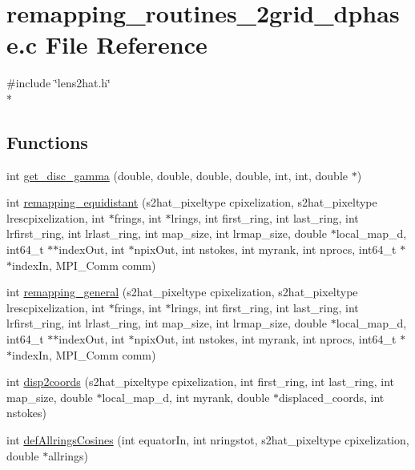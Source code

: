 \section{remapping\-\_\-routines\-\_\-2grid\-\_\-dphase.\-c File Reference}
\label{remapping__routines__2grid__dphase_8c}
{\ttfamily \#include \char`\"{}lens2hat.\-h\char`\"{}}\\*
\subsection*{Functions}
\begin{DoxyCompactItemize}
\item 
int \hyperlink{remapping__routines__2grid__dphase_8c_a1b3f8c12ad0e5be19dd0ca576a9fcfd4}{get\-\_\-disc\-\_\-gamma} (double, double, double, double, int, int, double $\ast$)
\item 
int \hyperlink{remapping__routines__2grid__dphase_8c_aa829032557d0253f9757b049e87b5537}{remapping\-\_\-equidistant} (s2hat\-\_\-pixeltype cpixelization, s2hat\-\_\-pixeltype lrescpixelization, int $\ast$frings, int $\ast$lrings, int first\-\_\-ring, int last\-\_\-ring, int lrfirst\-\_\-ring, int lrlast\-\_\-ring, int map\-\_\-size, int lrmap\-\_\-size, double $\ast$local\-\_\-map\-\_\-d, int64\-\_\-t $\ast$$\ast$index\-Out, int $\ast$npix\-Out, int nstokes, int myrank, int nprocs, int64\-\_\-t $\ast$$\ast$index\-In, M\-P\-I\-\_\-\-Comm comm)
\item 
int \hyperlink{remapping__routines__2grid__dphase_8c_a93805e94f014beb4f1f2665303b82ca0}{remapping\-\_\-general} (s2hat\-\_\-pixeltype cpixelization, s2hat\-\_\-pixeltype lrescpixelization, int $\ast$frings, int $\ast$lrings, int first\-\_\-ring, int last\-\_\-ring, int lrfirst\-\_\-ring, int lrlast\-\_\-ring, int map\-\_\-size, int lrmap\-\_\-size, double $\ast$local\-\_\-map\-\_\-d, int64\-\_\-t $\ast$$\ast$index\-Out, int $\ast$npix\-Out, int nstokes, int myrank, int nprocs, int64\-\_\-t $\ast$$\ast$index\-In, M\-P\-I\-\_\-\-Comm comm)
\item 
int \hyperlink{remapping__routines__2grid__dphase_8c_a8224d455c626532938c1729f5e62daee}{disp2coords} (s2hat\-\_\-pixeltype cpixelization, int first\-\_\-ring, int last\-\_\-ring, int map\-\_\-size, double $\ast$local\-\_\-map\-\_\-d, int myrank, double $\ast$displaced\-\_\-coords, int nstokes)
\item 
int \hyperlink{remapping__routines__2grid__dphase_8c_af6cfda4741a11339b5a1d9c599411b87}{def\-Allrings\-Cosines} (int equator\-In, int nringstot, s2hat\-\_\-pixeltype cpixelization, double $\ast$allrings)

\end{DoxyCompactItemize}

